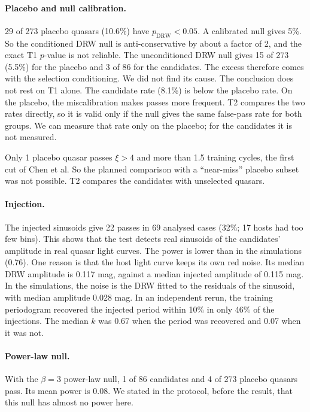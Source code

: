 \documentclass[11pt]{article}
\begin{document}
\paragraph{Placebo and null calibration.} 29 of 273 placebo quasars (10.6\%) have $p_\text{DRW}<0.05$. A calibrated null gives 5\%. So the conditioned DRW null is anti-conservative by about a factor of 2, and the exact T1 $p$-value is not reliable. The unconditioned DRW null gives 15 of 273 (5.5\%) for the placebo and 3 of 86 for the candidates. The excess therefore comes with the selection conditioning. We did not find its cause. The conclusion does not rest on T1 alone. The candidate rate (8.1\%) is below the placebo rate. On the placebo, the miscalibration makes passes more frequent. T2 compares the two rates directly, so it is valid only if the null gives the same false-pass rate for both groups. We can measure that rate only on the placebo; for the candidates it is not measured.

Only 1 placebo quasar passes $\xi>4$ and more than 1.5 training cycles, the first cut of Chen et al. So the planned comparison with a ``near-miss'' placebo subset was not possible. T2 compares the candidates with unselected quasars.

\paragraph{Injection.} The injected sinusoids give 22 passes in 69 analysed cases (32\%; 17 hosts had too few bins). This shows that the test detects real sinusoids of the candidates' amplitude in real quasar light curves. The power is lower than in the simulations (0.76). One reason is that the host light curve keeps its own red noise. Its median DRW amplitude is 0.117 mag, against a median injected amplitude of 0.115 mag. In the simulations, the noise is the DRW fitted to the residuals of the sinusoid, with median amplitude 0.028 mag. In an independent rerun, the training periodogram recovered the injected period within 10\% in only 46\% of the injections. The median $k$ was 0.67 when the period was recovered and 0.07 when it was not.

\paragraph{Power-law null.} With the $\beta=3$ power-law null, 1 of 86 candidates and 4 of 273 placebo quasars pass. Its mean power is 0.08. We stated in the protocol, before the result, that this null has almost no power here.
\end{document}
